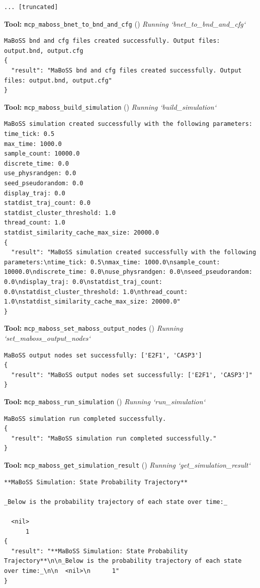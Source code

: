 \documentclass[11pt,a4paper]{article}
\begin{document}
\begin{toolokbox}
\begin{lstlisting}
... [truncated]
\end{lstlisting}
\end{toolokbox}
\begin{toolokbox}
\textbf{Tool:} \texttt{mcp\_maboss\_bnet\_to\_bnd\_and\_cfg} (\checkmark)
\textit{Running `bnet\_to\_bnd\_and\_cfg`}
\begin{lstlisting}
MaBoSS bnd and cfg files created successfully. Output files: output.bnd, output.cfg
{
  "result": "MaBoSS bnd and cfg files created successfully. Output files: output.bnd, output.cfg"
}
\end{lstlisting}
\end{toolokbox}
\begin{toolokbox}
\textbf{Tool:} \texttt{mcp\_maboss\_build\_simulation} (\checkmark)
\textit{Running `build\_simulation`}
\begin{lstlisting}
MaBoSS simulation created successfully with the following parameters:
time_tick: 0.5
max_time: 1000.0
sample_count: 10000.0
discrete_time: 0.0
use_physrandgen: 0.0
seed_pseudorandom: 0.0
display_traj: 0.0
statdist_traj_count: 0.0
statdist_cluster_threshold: 1.0
thread_count: 1.0
statdist_similarity_cache_max_size: 20000.0
{
  "result": "MaBoSS simulation created successfully with the following parameters:\ntime_tick: 0.5\nmax_time: 1000.0\nsample_count: 10000.0\ndiscrete_time: 0.0\nuse_physrandgen: 0.0\nseed_pseudorandom: 0.0\ndisplay_traj: 0.0\nstatdist_traj_count: 0.0\nstatdist_cluster_threshold: 1.0\nthread_count: 1.0\nstatdist_similarity_cache_max_size: 20000.0"
}
\end{lstlisting}
\end{toolokbox}
\begin{toolokbox}
\textbf{Tool:} \texttt{mcp\_maboss\_set\_maboss\_output\_nodes} (\checkmark)
\textit{Running `set\_maboss\_output\_nodes`}
\begin{lstlisting}
MaBoSS output nodes set successfully: ['E2F1', 'CASP3']
{
  "result": "MaBoSS output nodes set successfully: ['E2F1', 'CASP3']"
}
\end{lstlisting}
\end{toolokbox}
\begin{toolokbox}
\textbf{Tool:} \texttt{mcp\_maboss\_run\_simulation} (\checkmark)
\textit{Running `run\_simulation`}
\begin{lstlisting}
MaBoSS simulation run completed successfully.
{
  "result": "MaBoSS simulation run completed successfully."
}
\end{lstlisting}
\end{toolokbox}
\begin{toolokbox}
\textbf{Tool:} \texttt{mcp\_maboss\_get\_simulation\_result} (\checkmark)
\textit{Running `get\_simulation\_result`}
\begin{lstlisting}
**MaBoSS Simulation: State Probability Trajectory**

_Below is the probability trajectory of each state over time:_

  <nil>
      1
{
  "result": "**MaBoSS Simulation: State Probability Trajectory**\n\n_Below is the probability trajectory of each state over time:_\n\n  <nil>\n      1"
}
\end{lstlisting}
\end{toolokbox}
\end{document}
